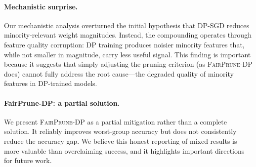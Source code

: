 \documentclass{article}
\newcommand{\FairPrunDP}{\textsc{FairPrune-DP}}
\begin{document}
\paragraph{Mechanistic surprise.}
Our mechanistic analysis overturned the initial hypothesis that DP-SGD reduces minority-relevant weight magnitudes. Instead, the compounding operates through feature quality corruption: DP training produces noisier minority features that, while not smaller in magnitude, carry less useful signal. This finding is important because it suggests that simply adjusting the pruning criterion (as \FairPrunDP{} does) cannot fully address the root cause---the degraded quality of minority features in DP-trained models.

\paragraph{FairPrune-DP: a partial solution.}
We present \FairPrunDP{} as a partial mitigation rather than a complete solution. It reliably improves worst-group accuracy but does not consistently reduce the accuracy gap. We believe this honest reporting of mixed results is more valuable than overclaiming success, and it highlights important directions for future work.
\end{document}
